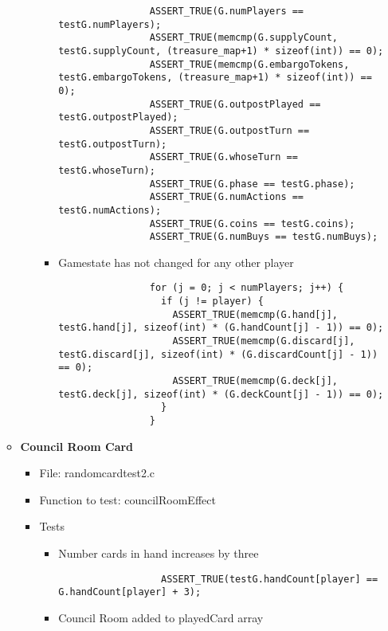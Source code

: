 \documentclass[11pt,letterpaper]{article}
\begin{document}
\begin{enumerate}[label=\arabic*., leftmargin=*]
\begin{itemize}[leftmargin=*]
\begin{itemize}[leftmargin=*]
\begin{itemize}[leftmargin=*]
                \begin{lstlisting}
                ASSERT_TRUE(G.numPlayers == testG.numPlayers);
                ASSERT_TRUE(memcmp(G.supplyCount, testG.supplyCount, (treasure_map+1) * sizeof(int)) == 0);
                ASSERT_TRUE(memcmp(G.embargoTokens, testG.embargoTokens, (treasure_map+1) * sizeof(int)) == 0);
                ASSERT_TRUE(G.outpostPlayed == testG.outpostPlayed);
                ASSERT_TRUE(G.outpostTurn == testG.outpostTurn);
                ASSERT_TRUE(G.whoseTurn == testG.whoseTurn);
                ASSERT_TRUE(G.phase == testG.phase); 
                ASSERT_TRUE(G.numActions == testG.numActions); 
                ASSERT_TRUE(G.coins == testG.coins); 
                ASSERT_TRUE(G.numBuys == testG.numBuys); 
                \end{lstlisting}

              \item Gamestate has not changed for any other player

                \begin{lstlisting}
                for (j = 0; j < numPlayers; j++) {
                  if (j != player) {
                    ASSERT_TRUE(memcmp(G.hand[j], testG.hand[j], sizeof(int) * (G.handCount[j] - 1)) == 0);
                    ASSERT_TRUE(memcmp(G.discard[j], testG.discard[j], sizeof(int) * (G.discardCount[j] - 1)) == 0);
                    ASSERT_TRUE(memcmp(G.deck[j], testG.deck[j], sizeof(int) * (G.deckCount[j] - 1)) == 0);
                  }
                }
                \end{lstlisting}
          \end{itemize}
      \end{itemize}


      \item \textbf{Council Room Card}
        \begin{itemize}[leftmargin=*]
          \item File: randomcardtest2.c
          \item Function to test: councilRoomEffect
          \item Tests
        \begin{itemize}[leftmargin=*]
              \item Number cards in hand increases by three
                  \begin{lstlisting}
                  ASSERT_TRUE(testG.handCount[player] == G.handCount[player] + 3);
                  \end{lstlisting}
              \item Council Room added to playedCard array


\end{itemize}
\end{itemize}
\end{itemize}
\end{enumerate}
\end{document}
